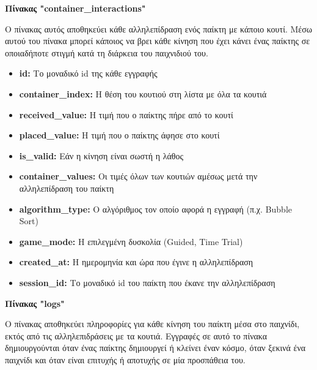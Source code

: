 
\vspace{5mm}
\textbf{Πίνακας "container\_interactions"}

Ο πίνακας αυτός αποθηκεύει κάθε αλληλεπίδραση ενός παίκτη με κάποιο κουτί. Μέσω αυτού του πίνακα μπορεί κάποιος να βρει κάθε κίνηση που έχει κάνει ένας παίκτης σε οποιαδήποτε στιγμή κατά τη διάρκεια του παιχνιδιού του.

\begin{itemize}
    \item \textbf{id:} Το μοναδικό id της κάθε εγγραφής
    \item \textbf{container\_index:} Η θέση του κουτιού στη λίστα με όλα τα κουτιά
    \item \textbf{received\_value:} Η τιμή που ο παίκτης πήρε από το κουτί
    \item \textbf{placed\_value:} Η τιμή που ο παίκτης άφησε στο κουτί
    \item \textbf{is\_valid:} Εάν η κίνηση είναι σωστή η λάθος
    \item \textbf{container\_values:} Οι τιμές όλων των κουτιών αμέσως μετά την αλληλεπίδραση του παίκτη
    \item \textbf{algorithm\_type:} Ο αλγόριθμος τον οποίο αφορά η εγγραφή (π.χ. Bubble Sort)
    \item \textbf{game\_mode:} Η επιλεγμένη δυσκολία (Guided, Time Trial)
    \item \textbf{created\_at:} Η ημερομηνία και ώρα που έγινε η αλληλεπίδραση
    \item \textbf{session\_id:} Το μοναδικό id του παίκτη που έκανε την αλληλεπίδραση
\end{itemize}


\vspace{5mm}
\textbf{Πίνακας "logs"}

Ο πίνακας αποθηκεύει πληροφορίες για κάθε κίνηση του παίκτη μέσα στο παιχνίδι, εκτός από τις αλληλεπιδράσεις με τα κουτιά. Εγγραφές σε αυτό το πίνακα δημιουργούνται όταν ένας παίκτης δημιουργεί ή κλείνει έναν κόσμο, όταν ξεκινά ένα παιχνίδι και όταν είναι επιτυχής ή αποτυχής σε μία προσπάθεια του.

